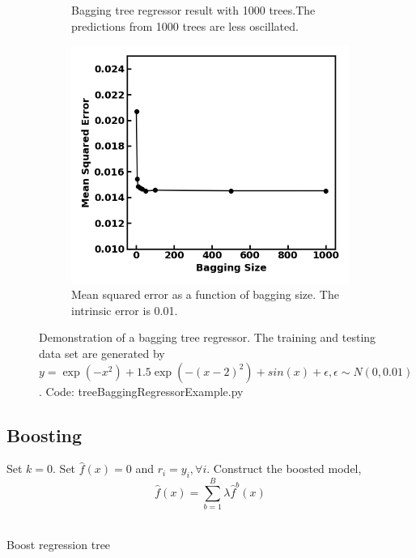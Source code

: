 \begin{refsection}
\begin{figure}[H]
\begin{subfigure}[b]{0.42\textwidth}
	\caption{Bagging tree regressor result with 1000 trees.The predictions from 1000 trees are less oscillated. }
\end{subfigure}\quad
	\begin{subfigure}[b]{0.42\textwidth}
		\centering
		\includegraphics[width=1\linewidth]{../figures/statisticalLearning/treeMethods/BaggingTreeRegressorExampleAccuracy}
		\caption{Mean squared error as a function of bagging size. The intrinsic error is 0.01.}
		\label{fig:BaggingTreeRegressionDemo}
	\end{subfigure}
	\caption{Demonstration of a bagging tree regressor. The training and testing data set are generated by $y = \exp(-x^2) + 1.5\exp(-(x-2)^2) + sin(x) + \epsilon, \epsilon\sim N(0,0.01)$. Code: treeBaggingRegressorExample.py}
\end{figure}

\subsection{Boosting}



\begin{algorithm}[H]
	\SetAlgoLined
	Set $k = 0$. Set $\hat{f}(x) = 0$ and $r_i = y_i, \forall i$.
	Construct the boosted model,
	$$\hat{f}(x) = \sum_{b=1}^B \lambda \hat{f}^b(x)$$\\
	\caption{Boost regression tree}
\end{algorithm}



\end{refsection}
